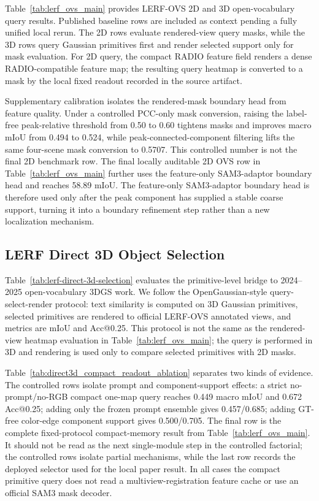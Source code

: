\documentclass[journal,twoside]{IEEEtran}
\begin{document}


Table~\ref{tab:lerf_ovs_main} provides LERF-OVS 2D and 3D open-vocabulary
query results. Published baseline rows are included as context pending a fully
unified local rerun. The 2D rows evaluate rendered-view query
masks, while the 3D rows query Gaussian primitives first and render selected
support only for mask evaluation. For 2D query, the compact
RADIO feature field renders a dense RADIO-compatible feature map; the resulting
query heatmap is converted to a mask by the local fixed readout recorded in the
source artifact.

Supplementary calibration isolates the rendered-mask boundary head from
feature quality. Under a controlled PCC-only mask conversion, raising the
label-free peak-relative threshold from 0.50 to 0.60 tightens masks and improves
macro mIoU from 0.494 to 0.524, while peak-connected-component filtering lifts
the same four-scene mask conversion to 0.5707. This controlled number is not the
final 2D benchmark row. The final locally auditable 2D OVS row in
Table~\ref{tab:lerf_ovs_main} further uses the feature-only SAM3-adaptor
boundary head and reaches 58.89 mIoU.
The feature-only SAM3-adaptor boundary head is therefore used only after the
peak component has supplied a stable coarse support, turning it into a boundary
refinement step rather than a new localization mechanism.

\subsection{LERF Direct 3D Object Selection}



Table~\ref{tab:lerf-direct-3d-selection} evaluates the primitive-level bridge to
2024--2025 open-vocabulary 3DGS work. We follow the OpenGaussian-style
query-select-render protocol: text similarity is computed on 3D Gaussian
primitives, selected primitives are rendered to official LERF-OVS annotated
views, and metrics are mIoU and Acc@0.25. This protocol is not the same as the
rendered-view heatmap evaluation in Table~\ref{tab:lerf_ovs_main}; the query is performed
in 3D and rendering is used only to compare selected primitives with 2D masks.



Table~\ref{tab:direct3d_compact_readout_ablation} separates two kinds of
evidence. The controlled rows isolate prompt and component-support effects: a
strict no-prompt/no-RGB compact one-map query reaches 0.449 macro mIoU and
0.672 Acc@0.25; adding only the frozen prompt ensemble gives 0.457/0.685; adding
GT-free color-edge component support gives 0.500/0.705. The final row is the
complete fixed-protocol compact-memory result from Table~\ref{tab:lerf_ovs_main}.
It should not be read as the next single-module step in the controlled
factorial; the controlled rows isolate partial mechanisms, while the last row
records the deployed selector used for the local paper result. In all cases the
compact primitive query
does not read a multiview-registration feature cache or use an official SAM3
mask decoder.
\end{document}
